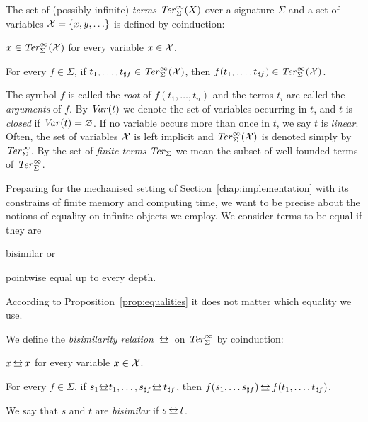 \begin{definition}%
The set of (possibly infinite) \emph{terms} $\mathit{Ter}_\Sigma^\infty(X)$ over a
signature $\Sigma$ and a set of variables $\mathcal{X} = \{x, y, \ldots\}$ is
defined by coinduction:
\begin{compactenum}
  \item
    $x \in \mathit{Ter}_\Sigma^\infty(\mathcal{X})$ for every variable $x \in \mathcal{X}$.
  \item
    For every $f \in \Sigma$, if $t_1, \ldots, t_{\sharp f} \in
    \mathit{Ter}_\Sigma^\infty(\mathcal{X})$, then $f(t_1, \ldots, t_{\sharp f}) \in \mathit{Ter}_\Sigma^\infty(\mathcal{X})$.
\end{compactenum}
\end{definition}

The symbol $f$ is called the \emph{root} of $f(t_1, \ldots, t_n)$ and
the terms $t_i$ are called the \emph{arguments} of $f$. By $\mathit{Var}(t)$
we denote the set of variables occurring in $t$, and $t$ is
\emph{closed} if $\mathit{Var}(t) = \varnothing$. If no variable occurs more than
once in $t$, we say $t$ is \emph{linear}. Often, the set of variables
$\mathcal{X}$ is left implicit and $\mathit{Ter}_\Sigma^\infty(\mathcal{X})$ is denoted simply by $\mathit{Ter}_\Sigma^\infty$. By
the set of \emph{finite terms} $\mathit{Ter}_\Sigma$ we mean the subset of
well-founded terms of $\mathit{Ter}_\Sigma^\infty$.

Preparing for the mechanised setting of Section~\ref{chap:implementation} with
its constrains of finite memory and computing time, we want to be precise
about the notions of equality on infinite objects we employ. We consider terms
to be equal if they are
\begin{inparaenum}[(i)]
  \item bisimilar or
  \item pointwise equal up to every depth.
\end{inparaenum}
According to Proposition~\ref{prop:equalities} it does not matter
which equality we use.

\begin{definition}\label{def:bisimilarity}%
We define the \emph{bisimilarity relation} $\bis$ on $\mathit{Ter}_\Sigma^\infty$ by
coinduction:
\begin{compactenum}
  \item
    $x \bis x$ for every variable $x \in \mathcal{X}$.
  \item
    For every $f \! \in \! \Sigma$, if $s_1 \! \bis \! t_1, \ldots,
    s_{\arity{f}} \! \bis t_{\arity{f}}$, then $f(s_1, \ldots
    s_{\arity{f}}) \bis f(t_1, \ldots, t_{\arity{f}})$.
\end{compactenum}
We say that $s$ and $t$ are \emph{bisimilar} if $s \bis t$.
\end{definition}

